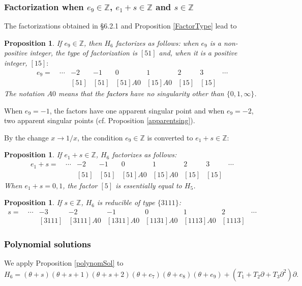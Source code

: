 \documentclass[a4paper,12pt]{article}
\newtheorem{prp}[thm]{Proposition}
\theoremstyle{definition}
\theoremstyle{remark}
\numberwithin{equation}{section} %
\newcommand{\blue}[1]{\textcolor{black}{#1}}
\begin{document}
\subsubsection{Factorization when $e_9\in{\mathbb Z}$, $e_1+s\in{\mathbb Z}$ and $s\in{\mathbb Z}$}
The factorizations obtained in \S 6.2.1 and Proposition \ref{FactorType} lead to
\begin{prp}\label{E6red_e9}
  If $e_9\in {\mathbb Z}$, then $H_6$ factorizes as follows: when $e_9$ is
  a non-positive integer, the type of factorization is $[51]$ and, when
  it is a positive integer, $[15]:$
   $$\begin{array}{ccccccccc}
e_9=\ & \cdots &-2    &-1   & 0   & 1     & 2    &3      &\cdots\\   
& &[51]&[51]&[51]A0&[15]A0&[15]&[15]&    
  \end{array}$$
  The notation $A0$ means that the \blue{factors} have no singularity other than   $\{0, 1, \infty\}$.
\end{prp}
When $e_9=-1$, the factors have one apparent singular point and when $e_9=-2$,
two apparent singular points (cf. Proposition \ref{apparentsing}).

By the change $x\to1/x$, the condition $e_9\in\mathbb{Z}$ is converted to $e_1+s\in\mathbb{Z}$:
\begin{prp}If $e_1+s\in\mathbb{Z}$, $H_6$ factorizes as follows:
 $$\begin{array}{ccccccccc}
e_1+s=\ & \cdots &-2    &-1   & 0   & 1     & 2    &3      &\cdots\\   
& &[51]&[51]&[51]A0&[15]A0&[15]&[15]&    
  \end{array}$$
  When $e_1+s=0,1$, the factor $[5]$ is essentially equal to $H_5$.
  \end{prp} 


\begin{prp}\label{prp1113}
  If $s\in\mathbb{Z}$, $H_6$ is reducible of type $\{3111\}$:
  $$\begin{array}{ccccccccc}
      s=\ & \cdots &-3 &-2  & -1  & 0      & 1      &2       &\cdots\\   
          &        &[3111]&[3111]A0&[1311]A0&[1131]A0&[1113]A0&[1113]&
  \end{array}$$
\end{prp}
\subsubsection{\blue{Polynomial solutions}}\label{polynomSolH6}
We apply Proposition \ref{polynomSol} to 
  $$H_6=(\theta+s)(\theta+s+1)(\theta+s+2)(\theta+e_7)(\theta+e_8)(\theta+e_9)+(T_1+T_2\partial+T_3\partial^2)\partial.$$
\end{document}
